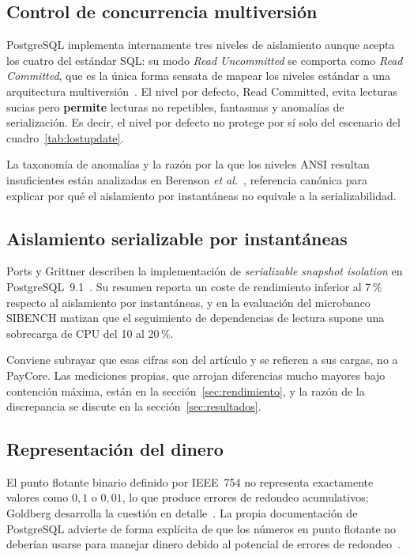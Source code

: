 \subsection{Control de concurrencia multiversión}

PostgreSQL implementa internamente tres niveles de aislamiento aunque acepta
los cuatro del estándar SQL: su modo \emph{Read Uncommitted} se comporta como
\emph{Read Committed}, que es la única forma sensata de mapear los niveles
estándar a una arquitectura multiversión~\cite{pg16iso}. El nivel por defecto,
Read Committed, evita lecturas sucias pero \textbf{permite} lecturas no
repetibles, fantasmas y anomalías de serialización. Es decir, el nivel por
defecto no protege por sí solo del escenario del cuadro~\ref{tab:lostupdate}.

La taxonomía de anomalías y la razón por la que los niveles ANSI resultan
insuficientes están analizadas en Berenson \emph{et al.}~\cite{berenson1995},
referencia canónica para explicar por qué el aislamiento por instantáneas no
equivale a la serializabilidad.

\subsection{Aislamiento serializable por instantáneas}

Ports y Grittner describen la implementación de \emph{serializable snapshot
isolation} en PostgreSQL~9.1~\cite{ports2012}. Su resumen reporta un coste de
rendimiento inferior al 7\,\% respecto al aislamiento por instantáneas, y en
la evaluación del microbanco SIBENCH matizan que el seguimiento de
dependencias de lectura supone una sobrecarga de CPU del 10 al 20\,\%.

Conviene subrayar que esas cifras son del artículo y se refieren a sus cargas,
no a PayCore. Las mediciones propias, que arrojan diferencias mucho mayores
bajo contención máxima, están en la sección~\ref{sec:rendimiento}, y la razón
de la discrepancia se discute en la sección~\ref{sec:resultados}.

\subsection{Representación del dinero}

El punto flotante binario definido por IEEE~754 no representa exactamente
valores como $0{,}1$ o $0{,}01$, lo que produce errores de redondeo
acumulativos; Goldberg desarrolla la cuestión en detalle~\cite{goldberg1991}.
La propia documentación de PostgreSQL advierte de forma explícita de que los
números en punto flotante no deberían usarse para manejar dinero debido al
potencial de errores de redondeo~\cite{pg16money}.

